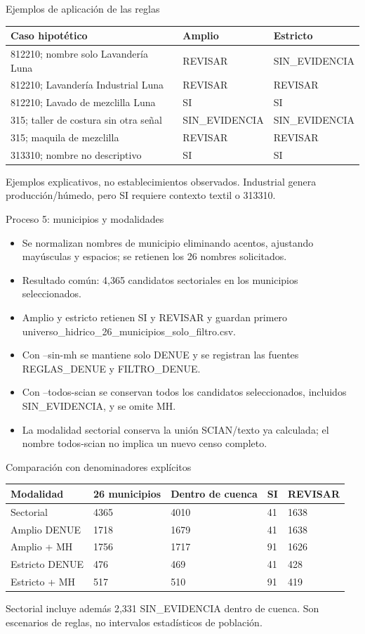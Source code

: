 \documentclass[aspectratio=169,10pt]{beamer}
\begin{document}
\begin{frame}{Ejemplos de aplicación de las reglas}\centering\scriptsize
\begin{tabular}{lll}\toprule
Caso hipotético & Amplio & Estricto\\\midrule
812210; nombre solo Lavandería Luna & REVISAR & SIN\_EVIDENCIA\\
812210; Lavandería Industrial Luna & REVISAR & REVISAR\\
812210; Lavado de mezclilla Luna & SI & SI\\
315; taller de costura sin otra señal & SIN\_EVIDENCIA & SIN\_EVIDENCIA\\
315; maquila de mezclilla & REVISAR & REVISAR\\
313310; nombre no descriptivo & SI & SI\\
\bottomrule\end{tabular}
\par\medskip Ejemplos explicativos, no establecimientos observados. Industrial genera producción/húmedo, pero SI requiere contexto textil o 313310.\end{frame}
\begin{frame}{Proceso 5: municipios y modalidades}
\small
\begin{itemize}
\item Se normalizan nombres de municipio eliminando acentos, ajustando mayúsculas y espacios; se retienen los 26 nombres solicitados.
\item Resultado común: 4,365 candidatos sectoriales en los municipios seleccionados.
\item Amplio y estricto retienen SI y REVISAR y guardan primero universo\_hidrico\_26\_municipios\_solo\_filtro.csv.
\item Con --sin-mh se mantiene solo DENUE y se registran las fuentes REGLAS\_DENUE y FILTRO\_DENUE.
\item Con --todos-scian se conservan todos los candidatos seleccionados, incluidos SIN\_EVIDENCIA, y se omite MH.
\item La modalidad sectorial conserva la unión SCIAN/texto ya calculada; el nombre todos-scian no implica un nuevo censo completo.
\end{itemize}
\end{frame}
\begin{frame}{Comparación con denominadores explícitos}\centering\scriptsize
\begin{tabular}{lllll}\toprule
Modalidad & 26 municipios & Dentro de cuenca & SI & REVISAR\\\midrule
Sectorial & 4365 & 4010 & 41 & 1638\\
Amplio DENUE & 1718 & 1679 & 41 & 1638\\
Amplio + MH & 1756 & 1717 & 91 & 1626\\
Estricto DENUE & 476 & 469 & 41 & 428\\
Estricto + MH & 517 & 510 & 91 & 419\\
\bottomrule\end{tabular}
\par\medskip Sectorial incluye además 2,331 SIN\_EVIDENCIA dentro de cuenca. Son escenarios de reglas, no intervalos estadísticos de población.\end{frame}
\end{document}
